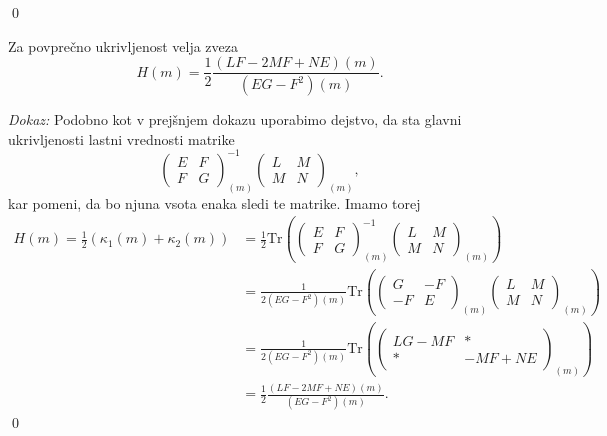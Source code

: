 \qed

\begin{izrek}
\label{izr_izrazava_povprecne_ukrivljenosti}
 Za povprečno ukrivljenost velja zveza \begin{equation*}
 H(m) = \frac{1}{2} \frac{(LF - 2MF + NE)(m)}{(EG - F^2)(m)}.
 \end{equation*}  
\end{izrek}
\noident
{\em Dokaz:\/}
Podobno kot v prejšnjem dokazu uporabimo dejstvo, da sta glavni ukrivljenosti lastni vrednosti matrike \begin{equation*}
  \begin{pmatrix}
    E & F \\
    F & G
    \end{pmatrix}_{(m)}^{-1}\begin{pmatrix}
    L & M \\
    M & N
    \end{pmatrix}_{(m)},
  \end{equation*}  
kar pomeni, da bo njuna vsota enaka sledi te matrike. Imamo torej \begin{align*}
  H(m) = \frac{1}{2}(\kappa_1(m) + \kappa_2(m)) &= \frac{1}{2} \mathrm{Tr} \left( \begin{pmatrix}
    E & F \\
    F & G
    \end{pmatrix}_{(m)}^{-1}\begin{pmatrix}
    L & M \\
    M & N
    \end{pmatrix}_{(m)} \right)   \\
     &= \frac{1}{2(EG - F^2)(m)} \mathrm{Tr} \left(  \begin{pmatrix}
      G & -F \\
      -F & E
      \end{pmatrix}_{(m)} \begin{pmatrix}
      L & M \\
      M & N
      \end{pmatrix}_{(m)} \right) \\
      &=  \frac{1}{2(EG - F^2)(m)} \mathrm{Tr} \left( \begin{pmatrix}
        LG - MF & * \\
        * & -MF + NE
        \end{pmatrix}_{(m)} \right) \\
        &= \frac{1}{2} \frac{(LF - 2MF + NE)(m)}{(EG - F^2)(m)}.
\end{align*}
\qed


